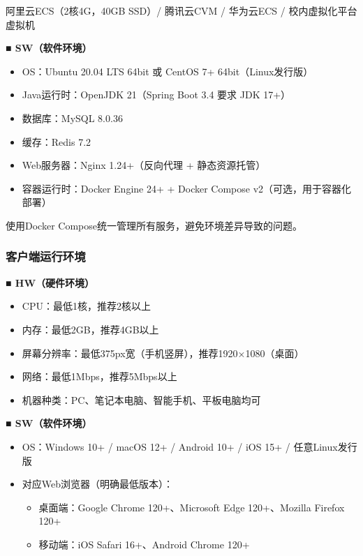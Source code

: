 \documentclass[12pt,a4paper]{ctexart}
\numberwithin{figure}{section}
\numberwithin{table}{section}
\begin{document}
阿里云ECS（2核4G，40GB SSD）/ 腾讯云CVM / 华为云ECS / 校内虚拟化平台虚拟机

\textbf{■ SW（软件环境）}

\begin{itemize}
    \item OS：Ubuntu 20.04 LTS 64bit 或 CentOS 7+ 64bit（Linux发行版）
    \item Java运行时：OpenJDK 21（Spring Boot 3.4 要求 JDK 17+）
    \item 数据库：MySQL 8.0.36
    \item 缓存：Redis 7.2
    \item Web服务器：Nginx 1.24+（反向代理 + 静态资源托管）
    \item 容器运行时：Docker Engine 24+ + Docker Compose v2（可选，用于容器化部署）
\end{itemize}

使用Docker Compose统一管理所有服务，避免环境差异导致的问题。

\subsubsection{客户端运行环境}

\textbf{■ HW（硬件环境）}

\begin{itemize}
    \item CPU：最低1核，推荐2核以上
    \item 内存：最低2GB，推荐4GB以上
    \item 屏幕分辨率：最低375px宽（手机竖屏），推荐1920×1080（桌面）
    \item 网络：最低1Mbps，推荐5Mbps以上
    \item 机器种类：PC、笔记本电脑、智能手机、平板电脑均可
\end{itemize}

\textbf{■ SW（软件环境）}

\begin{itemize}
    \item OS：Windows 10+ / macOS 12+ / Android 10+ / iOS 15+ / 任意Linux发行版
    \item 对应Web浏览器（明确最低版本）：
    \begin{itemize}
        \item 桌面端：Google Chrome 120+、Microsoft Edge 120+、Mozilla Firefox 120+
        \item 移动端：iOS Safari 16+、Android Chrome 120+
    \end{itemize}
\end{itemize}
\end{document}
